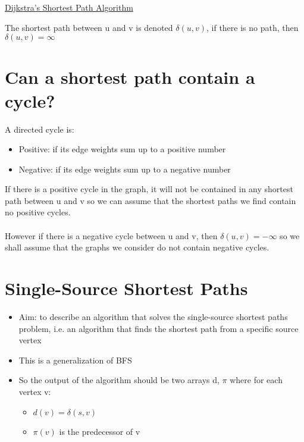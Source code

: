 \documentclass{article}[18pt]
\begin{document}
\begin{center}
\underline{\huge Dijkstra's Shortest Path Algorithm}
\end{center}
The shortest path between u and v is denoted $\delta(u,v)$, if there is no path, then $\delta(u,v)=\infty$
\section{Can a shortest path contain a cycle?}
A directed cycle is:
\begin{itemize}
	\item Positive: if its edge weights sum up to a positive number
	\item Negative: if its edge weights sum up to a negative number
\end{itemize}
If there is a positive cycle in the graph, it will not be contained in any shortest path between u and v so we can assume that the shortest paths we find contain no positive cycles.\\
\\
However if there is a negative cycle between u and v, then $\delta(u,v)=-\infty$ so we shall assume that the graphs we consider do not contain negative cycles.
\section{Single-Source Shortest Paths}
\begin{itemize}
	\item Aim: to describe an algorithm that solves the single-source shortest paths problem, i.e. an algorithm that finds the shortest path from a specific source vertex 
	\item This is a generalization of BFS
	\item So the output of the algorithm should be two arrays d, $\pi$ where for each vertex v:
	\begin{itemize}
		\item $d(v)=\delta(s,v)$
		\item $\pi(v)$ is the predecessor of v
	\end{itemize}
\end{itemize}
\end{document}
